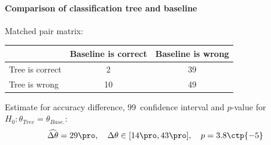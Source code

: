 \documentclass[11pt,fleqn]{article}
\begin{document}
\paragraph{Comparison of classification tree and baseline}
Matched pair matrix:

\begin{table}[H]
	\centering
	\begin{tabular}{l|c c}
		&Baseline is correct& Baseline is wrong \\
		\hline
		Tree is correct &2& 39\\
		Tree is wrong& 10& 49
	\end{tabular}
\end{table}\noindent 
Estimate for accuracy difference, 99\pro\ confidence interval and \(p\)-value for \(H_0: \theta_{Tree}=\theta_{Base.}\):
\[
\widehat{\Delta \theta} = 29\pro,\quad  \Delta \theta\in[14\pro , 43\pro], \quad p = 3.8\ctp{-5}
\]
\end{document}

